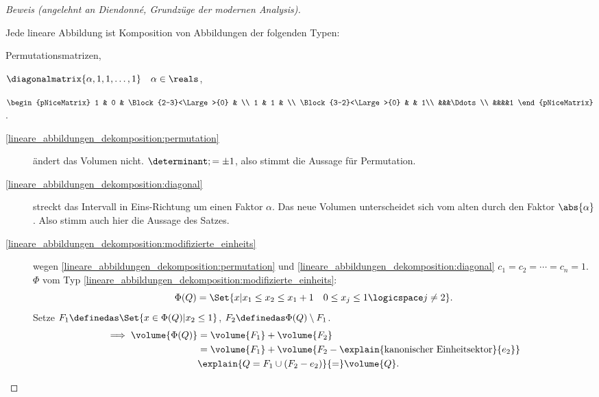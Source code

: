 \begin{proof}[Beweis (angelehnt an Diendonné, Grundzüge der modernen Analysis)]
\begin{subproof}
    Jede lineare Abbildung ist Komposition von Abbildungen der folgenden Typen:
    \begin{eigenschaftenenumerate}
      \item \label{lineare_abbildungen_dekomposition:permutation}Permutationsmatrizen,
      \item \label{lineare_abbildungen_dekomposition:diagonal}\( \diagonalmatrix{\alpha,1,1,\dotsc,1}\quad \alpha\in \reals \),
      \item \label{lineare_abbildungen_dekomposition:modifizierte_einheits}\( \begin{pNiceMatrix} 1 & 0 & \Block{2-3}<\Large>{0} &  \\ 1 & 1 &  \\  \Block{3-2}<\Large>{0} &  & 1\\
      &&&\Ddots\\
    &&&&1 \end{pNiceMatrix} \).
    \end{eigenschaftenenumerate}
    \begin{description}
      \item[\ref{lineare_abbildungen_dekomposition:permutation}] ändert das Volumen nicht. \( \determinant;=\pm 1 \), also stimmt die Aussage für Permutation.
      \item[\ref{lineare_abbildungen_dekomposition:diagonal}] streckt das Intervall in Eins-Richtung um einen Faktor \( \alpha \). Das neue Volumen unterscheidet sich vom alten durch den Faktor \( \abs{\alpha} \). Also stimm auch hier die Aussage des Satzes.
      \item[\ref{lineare_abbildungen_dekomposition:modifizierte_einheits}] wegen \ref{lineare_abbildungen_dekomposition:permutation} und \ref{lineare_abbildungen_dekomposition:diagonal} \obda \( c_1=c_2=\dotsb=c_n=1 \). \( \Phi \) vom Typ \ref{lineare_abbildungen_dekomposition:modifizierte_einheits}: 
      \begin{equation*}
        \Phi(Q)=\Set{x|x_1\leq x_2\leq x_1+1\quad 0\leq x_j\leq 1\logicspace j\neq 2}.
      \end{equation*}
      Setze \( F_1\definedas \Set{x\in \Phi(Q)|x_2\leq 1} \), \( F_2\definedas \Phi(Q)\setminus F_1 \).
      \begin{align*}
        \implies \volume{\Phi(Q)}&=\volume{F_1}+\volume{F_2}\\
        &=\volume{F_1}+\volume{F_2-\explain{\text{kanonischer Einheitsektor}}{e_2}}\\
        &\explain{Q=F_1\cup (F_2-e_2)}{=}\volume{Q}.
      \end{align*}

\end{description}
\end{subproof}
\end{proof}
